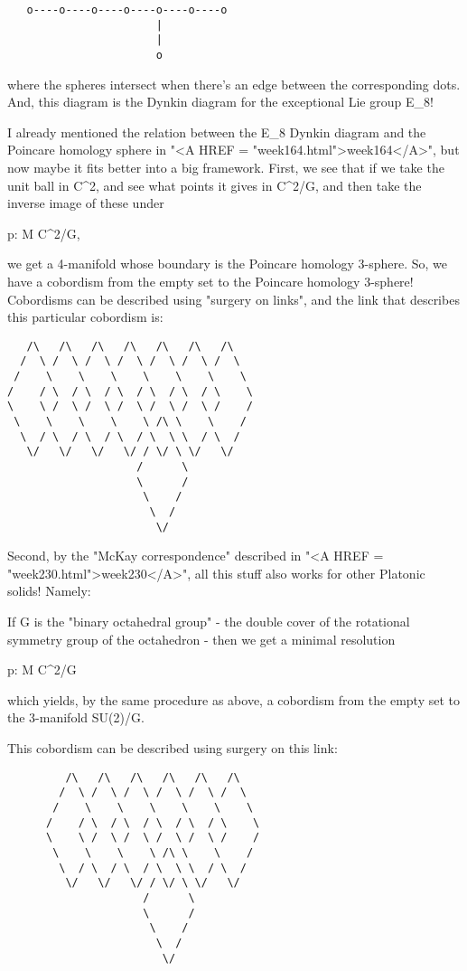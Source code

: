 \begin{verbatim}
   o----o----o----o----o----o----o
                       |
                       |
                       o
\end{verbatim}
    
where the spheres intersect when there's an edge between the
corresponding dots.  And, this diagram is the Dynkin diagram for 
the exceptional Lie group E_{8}! 

I already mentioned the relation between the E_{8} Dynkin
diagram and the Poincare homology sphere in "<A HREF =
"week164.html">week164</A>", but now maybe it fits better into a
big framework.  First, we see that if we take the unit ball in
C^{2}, and see what points it gives in C^{2}/G, and
then take the inverse image of these under

p: M \to  C^{2}/G, 

we get a 4-manifold whose boundary is the Poincare homology 
3-sphere.  So, we have a cobordism from the empty set to the 
Poincare homology 3-sphere!  Cobordisms can be described using
"surgery on links", and the link that describes this particular
cobordism is:

\begin{verbatim}
   /\   /\   /\   /\   /\   /\   /\ 
  /  \ /  \ /  \ /  \ /  \ /  \ /  \
 /    \    \    \    \    \    \    \
/    / \  / \  / \  / \  / \  / \    \ 
\    \ /  \ /  \ /  \ /  \ /  \ /    / 
 \    \    \    \    \ /\ \    \    /
  \  / \  / \  / \  / \  \ \  / \  /
   \/   \/   \/   \/ / \/ \ \/   \/
                    /      \ 
                    \      /
                     \    /
                      \  /
                       \/ 
\end{verbatim}
    

Second, by the "McKay correspondence" described in "<A
HREF = "week230.html">week230</A>", all this stuff also works for
other Platonic solids!  Namely:

If G is the "binary octahedral group" - the double cover of the 
rotational symmetry group of the octahedron - then we get a minimal 
resolution

p: M \to  C^{2}/G

which yields, by the same procedure as above, a cobordism from the 
empty set to the 3-manifold SU(2)/G.  

This cobordism can be described using surgery on this link:


\begin{verbatim}
         /\   /\   /\   /\   /\   /\ 
        /  \ /  \ /  \ /  \ /  \ /  \
       /    \    \    \    \    \    \   
      /    / \  / \  / \  / \  / \    \ 
      \    \ /  \ /  \ /  \ /  \ /    / 
       \    \    \    \ /\ \    \    /
        \  / \  / \  / \  \ \  / \  /
         \/   \/   \/ / \/ \ \/   \/
                     /      \ 
                     \      /
                      \    /
                       \  /
                        \/ 
\end{verbatim}
    
